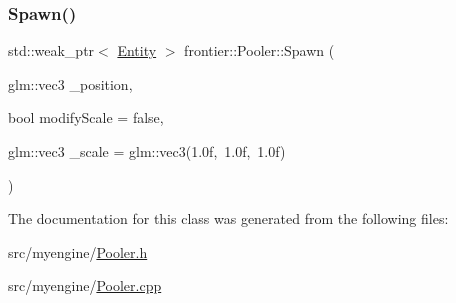 \mbox{\label{classfrontier_1_1_pooler_acd7ce56f3b19b8fb6e4eb2ba94328573}} 
\subsubsection{\texorpdfstring{Spawn()}{Spawn()}}
{\footnotesize\ttfamily std\+::weak\+\_\+ptr$<$ \hyperlink{classfrontier_1_1_entity}{Entity} $>$ frontier\+::\+Pooler\+::\+Spawn (\begin{DoxyParamCaption}\item[{glm\+::vec3}]{\+\_\+position,  }\item[{bool}]{modify\+Scale = {\ttfamily false},  }\item[{glm\+::vec3}]{\+\_\+scale = {\ttfamily glm\+:\+:vec3(1.0f,~1.0f,~1.0f)} }\end{DoxyParamCaption})}



The documentation for this class was generated from the following files\+:\begin{DoxyCompactItemize}
\item 
src/myengine/\hyperlink{_pooler_8h}{Pooler.\+h}\item 
src/myengine/\hyperlink{_pooler_8cpp}{Pooler.\+cpp}\end{DoxyCompactItemize}
